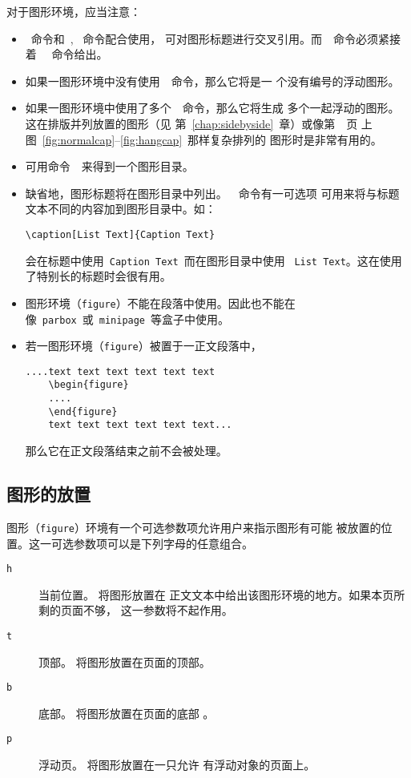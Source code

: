 对于图形环境，应当注意：
\begin{itemize}
	\item {}~命令和~, ~命令配合使用，
	可对图形标题进行交叉引用。而~~命令必须紧接着~~
	命令给出。
	\item 如果一图形环境中没有使用~~命令，那么它将是一
	个没有编号的浮动图形。
	\item 如果一图形环境中使用了多个~~命令，那么它将生成
	多个一起浮动的图形。这在排版并列放置的图形（见
	第~\ref{chap:sidebyside}~章）或像第~\pageref{fig:normalcap}~页
	上图~\ref{fig:normalcap}--\ref{fig:hangcap}~那样复杂排列的
	图形时是非常有用的。
	\item 可用命令~~来得到一个图形目录。
	\item 缺省地，图形标题将在图形目录中列出。~~命令有一可选项
	可用来将与标题文本不同的内容加到图形目录中。如：
	\begin{Verbatim}[xleftmargin=1cm]
	\caption[List Text]{Caption Text}
	\end{Verbatim}
	会在标题中使用~\texttt{Caption Text}~而在图形目录中使用
	~\texttt{List Text}。这在使用了特别长的标题时会很有用。
	\item 图形环境（\texttt{figure}）不能在段落中使用。因此也不能在
	像~\texttt{parbox}~或~\texttt{minipage}~等盒子中使用。
	\item 若一图形环境（\texttt{figure}）被置于一正文段落中，
	\begin{Verbatim}[xleftmargin=1cm]
	....text text text text text text 
	\begin{figure} 
	.... 
	\end{figure} 
	text text text text text text...      
	\end{Verbatim}
	那么它在正文段落结束之前不会被处理。
\end{itemize}

\subsection{图形的放置}\label{ssec:figplacement}

图形（\texttt{figure}）环境有一个可选参数项允许用户来指示图形有可能
被放置的位置。这一可选参数项可以是下列字母的任意组合。
\begin{description}
	\item [\texttt{h}] { 当前位置。} 将图形放置在
	正文文本中给出该图形环境的地方。如果本页所剩的页面不够，
	这一参数将不起作用。
	\item [\texttt{t}] { 顶部。} 将图形放置在页面的顶部。
	\item [\texttt{b}] { 底部。} 将图形放置在页面的底部
	。
	\item [\texttt{p}] { 浮动页。} 将图形放置在一只允许
	有浮动对象的页面上。
\end{description}

